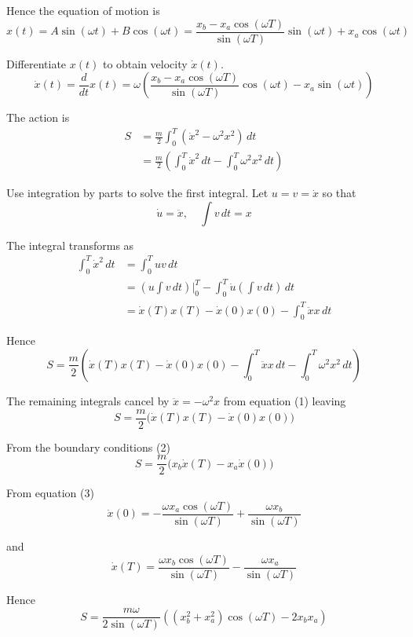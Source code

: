 Hence the equation of motion is
\begin{equation*}
x(t)
=A\sin(\omega t)+B\cos(\omega t)
=\frac{x_b-x_a\cos(\omega T)}{\sin(\omega T)}\sin(\omega t)+x_a\cos(\omega t)
\tag{3}
\end{equation*}

Differentiate $x(t)$ to obtain velocity $\dot x(t)$.
\begin{equation*}
\dot x(t)=\frac{d}{dt}x(t)=
\omega\left(
\frac{x_b-x_a\cos(\omega T)}{\sin(\omega T)}\cos(\omega t)-x_a\sin(\omega t)
\right)
\tag{4}
\end{equation*}

The action is
\begin{align*}
S&=\frac{m}{2}\int_0^T (\dot{x}^2-\omega^2 x^2)\,dt
\\[1ex]
&=\frac{m}{2}\left(
\int_0^T\dot{x}^2\,dt
-\int_0^T\omega^2x^2\,dt
\right)
\end{align*}

Use integration by parts to solve the first integral.
Let $u=v=\dot x$ so that
\begin{equation*}
\dot u=\ddot x,\quad
\int v\,dt=x
\end{equation*}

The integral transforms as
\begin{align*}
\int_0^T \dot x^2\,dt
&=\int_0^T uv\,dt
\\[1ex]
&=\left(u\int v\,dt\right)\bigg|_0^T
-\int_0^T\dot u\left(\int v\,dt\right)\,dt
\\[1ex]
&=\dot x(T)x(T)-\dot x(0)x(0)-\int_0^T \ddot xx\,dt
\end{align*}

Hence
\begin{equation*}
S=\frac{m}{2}\left(
\dot x(T)x(T)-\dot x(0)x(0)
-\int_0^T \ddot xx\,dt
-\int_0^T\omega^2x^2\,dt
\right)
\end{equation*}

The remaining integrals cancel by $\ddot x=-\omega^2x$ from equation (1) leaving
\begin{equation*}
S=\frac{m}{2}\bigl(\dot x(T)x(T)-\dot x(0)x(0)\bigr)
\tag{5}
\end{equation*}

From the boundary conditions (2)
\begin{equation*}
S=\frac{m}{2}\bigl(x_b\dot x(T)-x_a\dot x(0)\bigr)
\end{equation*}

From equation (3)
\begin{equation*}
\dot x(0)=-\frac{\omega x_a\cos(\omega T)}{\sin(\omega T)}+\frac{\omega x_b}{\sin(\omega T)}
\tag{6}
\end{equation*}

and
\begin{equation*}
\dot x(T)=\frac{\omega x_b\cos(\omega T)}{\sin(\omega T)}-\frac{\omega x_a}{\sin(\omega T)}
\tag{7}
\end{equation*}

Hence
\begin{equation*}
S=\frac{m\omega}{2\sin(\omega T)}
\left(\left(x_b^2+x_a^2\right)\cos(\omega T)-2x_b x_a\right)
\tag{8}
\end{equation*}


